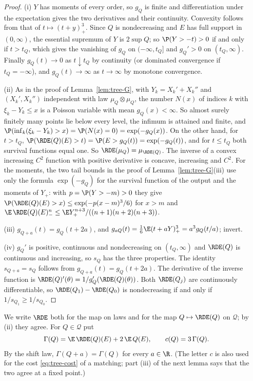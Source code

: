 \begin{proof}
(i) $Y$ has moments of every order, so $g_Q$ is finite and differentiation under the
expectation gives the two derivatives and their continuity. Convexity follows from that of
$t\mapsto(t+y)_+^3$. Since $Q$ is nondecreasing and $E$ has full support in $(0,\infty)$, the
essential supremum of $Y$ is $2\sup Q$; so $\P(Y>-t)>0$ if and only if $t>t_Q$, which gives the
vanishing of $g_Q$ on $(-\infty,t_Q]$ and $g_Q'>0$ on $(t_Q,\infty)$. Finally $g_Q(t)\to0$ as
$t\downarrow t_Q$ by continuity (or dominated convergence if $t_Q=-\infty$), and
$g_Q(t)\to\infty$ as $t\to\infty$ by monotone convergence.

(ii) As in the proof of Lemma~\ref{lem:tree-G}, with $Y_k=X_k'+X_k''$ and $(X_k',X_k'')$
independent with law $\mu_Q\otimes\mu_Q$, the number $N(x)$ of indices $k$ with
$\xi_k-Y_k\le x$ is a Poisson variable with mean $g_Q(x)<\infty$. So almost surely finitely
many points lie below every level, the infimum is attained and finite, and
$\P(\inf_k(\xi_k-Y_k)>x)=\P(N(x)=0)=\exp(-g_Q(x))$. On the other hand, for $t>t_Q$,
$\P(\RDE(Q)(E)>t)=\P(E>g_Q(t))=\exp(-g_Q(t))$, and for $t\le t_Q$ both survival functions equal
one. So $\RDE(\mu_Q)=\mu_{\RDE(Q)}$. The inverse of a convex increasing $C^2$ function with
positive derivative is concave, increasing and $C^2$. For the moments, the two tail bounds in
the proof of Lemma~\ref{lem:tree-G}(iii) use only the formula $\exp(-g_Q)$ for the survival
function of the output and the moments of $Y_+$: with $p=\P(Y>-m)>0$ they give
$\P(\RDE(Q)(E)>x)\le\exp(-p(x-m)^3/6)$ for $x>m$ and
$\E\,\RDE(Q)(E)_-^n\le\E Y_+^{n+3}/((n+1)(n+2)(n+3))$.

(iii) $g_{Q+a}(t)=g_Q(t+2a)$, and $g_{aQ}(t)=\tfrac16\E(t+aY)_+^3=a^3g_Q(t/a)$; invert.

(iv) $g_Q'$ is positive, continuous and nondecreasing on $(t_Q,\infty)$ and $\RDE(Q)$ is
continuous and increasing, so $s_Q$ has the three properties. The identity $s_{Q+a}=s_Q$
follows from $g_{Q+a}(t)=g_Q(t+2a)$. The derivative of the inverse function is
$\RDE(Q)'(\theta)=1/g_Q'(\RDE(Q)(\theta))$. Both $\RDE(Q_j)$ are continuously differentiable,
so $\RDE(Q_1)-\RDE(Q_0)$ is nondecreasing if and only if $1/s_{Q_1}\ge1/s_{Q_0}$.
\end{proof}

We write $\RDE$ both for the map on laws and for the map $Q\mapsto\RDE(Q)$ on $\mathcal{Q}$;
by (ii) they agree. For $Q\in\mathcal{Q}$ put
\begin{equation}\label{eq:existence-Gamma}
  \Gamma(Q)=\E\,\RDE(Q)(E)+2\,\E\,Q(E),\qquad c(Q)=3\,\Gamma(Q).
\end{equation}
By the shift law, $\Gamma(Q+a)=\Gamma(Q)$ for every $a\in\R$. (The letter $c$ is also used for
the cost \eqref{eq:tree-cost} of a matching; part (iii) of the next lemma says that the two
agree at a fixed point.)


